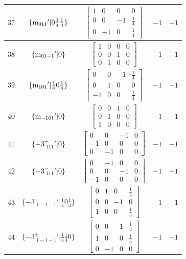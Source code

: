 \documentclass[fleqn,8pt]{jsarticle}
\begin{document}
\begin{longtable}{ccccc}
$ 37 $ & $ \{{\rm m}_{011}{}'|0 \frac{1}{4} \frac{1}{4}\} $ & $ \begin{bmatrix} 1 & 0 & 0 & 0 \\ 0 & 0 & -1 & \frac{1}{4} \\ 0 & -1 & 0 & \frac{1}{4} \end{bmatrix} $ & $ -1 $ & $ -1 $ \\ \hline
$ 38 $ & $ \{{\rm m}_{01-1}{}'|0\} $ & $ \begin{bmatrix} 1 & 0 & 0 & 0 \\ 0 & 0 & 1 & 0 \\ 0 & 1 & 0 & 0 \end{bmatrix} $ & $ -1 $ & $ -1 $ \\ \hline
$ 39 $ & $ \{{\rm m}_{101}{}'|\frac{1}{4} 0 \frac{1}{4}\} $ & $ \begin{bmatrix} 0 & 0 & -1 & \frac{1}{4} \\ 0 & 1 & 0 & 0 \\ -1 & 0 & 0 & \frac{1}{4} \end{bmatrix} $ & $ -1 $ & $ -1 $ \\ \hline
$ 40 $ & $ \{{\rm m}_{-101}{}'|0\} $ & $ \begin{bmatrix} 0 & 0 & 1 & 0 \\ 0 & 1 & 0 & 0 \\ 1 & 0 & 0 & 0 \end{bmatrix} $ & $ -1 $ & $ -1 $ \\ \hline
$ 41 $ & $ \{-3^{+}_{\,\,111}{}'|0\} $ & $ \begin{bmatrix} 0 & 0 & -1 & 0 \\ -1 & 0 & 0 & 0 \\ 0 & -1 & 0 & 0 \end{bmatrix} $ & $ -1 $ & $ -1 $ \\ \hline
$ 42 $ & $ \{-3^{-}_{\,\,111}{}'|0\} $ & $ \begin{bmatrix} 0 & -1 & 0 & 0 \\ 0 & 0 & -1 & 0 \\ -1 & 0 & 0 & 0 \end{bmatrix} $ & $ -1 $ & $ -1 $ \\ \hline
$ 43 $ & $ \{-3^{-}_{\,\,1-1-1}{}'|\frac{1}{4} 0 \frac{1}{4}\} $ & $ \begin{bmatrix} 0 & 1 & 0 & \frac{1}{4} \\ 0 & 0 & -1 & 0 \\ 1 & 0 & 0 & \frac{1}{4} \end{bmatrix} $ & $ -1 $ & $ -1 $ \\ \hline
$ 44 $ & $ \{-3^{+}_{\,\,1-1-1}{}'|\frac{1}{4} \frac{1}{4} 0\} $ & $ \begin{bmatrix} 0 & 0 & 1 & \frac{1}{4} \\ 1 & 0 & 0 & \frac{1}{4} \\ 0 & -1 & 0 & 0 \end{bmatrix} $ & $ -1 $ & $ -1 $ \\ \hline

\end{longtable}
\end{document}
